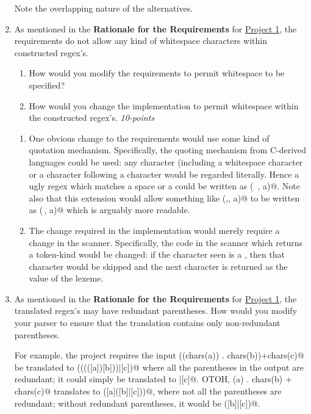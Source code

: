 \documentclass[12pt]{article}
\begin{document}
\begin{enumerate}
Note the overlapping nature of the alternatives.

\item As mentioned in the \textbf{Rationale for the Requirements} for
  \href{../../projects/prj1/prj1.html}{Project 1}, the requirements
  do not allow any kind of whitespace characters within constructed
  regex's.
  \begin{enumerate}

  \item How would you modify the requirements to permit whitespace
    to be specified?

  \item How would you change the implementation to permit
    whitespace within the constructed regex's. \hfill\textit{10-points}

  \end{enumerate}

  \begin{enumerate}

  \item One obvious change to the requirements would use some kind of
    quotation mechanism.  Specifically, the
    quoting mechanism from C-derived languages could be used: any
    character (including a whitespace character or a \verb@\@
    character following a \verb@\@ character would be regarded
    literally.  Hence a ugly regex which matches a space or a \verb@a@
    could be written as \verb@chars(\ , a)@.  Note also that this
    extension would allow something like \verb@chars(,, a)@ to be
    written as \verb@chars(\,, a)@ which is arguably more readable.

  \item The change required in the implementation would merely require
    a change in the scanner.  Specifically, the code in the scanner
    which returns a \verb@CHAR@ token-kind would be changed: if the
    character seen is a \verb@\@, then that character would be skipped
    and the next character is returned as the value of the \verb@CHAR@
    lexeme.

  \end{enumerate}
  
\item As mentioned in the \textbf{Rationale for the Requirements} for
  \href{../../projects/prj1/prj1.html}{Project 1}, the translated
  regex's may have redundant parentheses.  How would you modify your
  parser to ensure that the translation contains only non-redundant
  parentheses.

  For example, the project requires the input
  \verb@((chars(a)) . chars(b))+chars(c)@ be translated to
  \verb@(((([a])[b]))|[c])@ where all the parentheses in the
  output are redundant; it could simply be translated to
  \verb@[a][b]|[c]@.  OTOH,
  \verb@chars(a) . chars(b) + chars(c)@ translates to
  \verb@([a]([b]|[c]))@, where not all the parentheses are redundant;
  without redundant parentheses, it would be \verb@[a]([b]|[c])@.


\end{enumerate}
\end{document}
